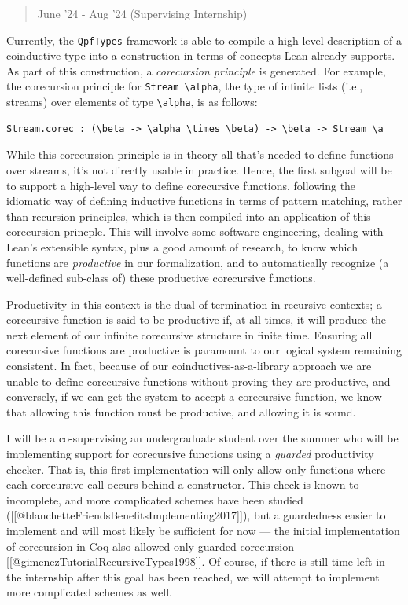 \documentclass[a4paper]{article}
\begin{document}
\begin{quote}
June '24 - Aug '24 (Supervising Internship)
\end{quote}

Currently, the \texttt{QpfTypes} framework is able to compile a
high-level description of a coinductive type into a construction in
terms of concepts Lean already supports. As part of this construction, a
\emph{corecursion principle} is generated. For example, the corecursion
principle for \texttt{Stream\ \textbackslash{}alpha}, the type of
infinite lists (i.e., streams) over elements of type
\texttt{\textbackslash{}alpha}, is as follows:

\begin{verbatim}
Stream.corec : (\beta -> \alpha \times \beta) -> \beta -> Stream \a
\end{verbatim}

While this corecursion principle is in theory all that's needed to
define functions over streams, it's not directly usable in practice.
Hence, the first subgoal will be to support a high-level way to define
corecursive functions, following the idiomatic way of defining inductive
functions in terms of pattern matching, rather than recursion
principles, which is then compiled into an application of this
corecursion princple. This will involve some software engineering,
dealing with Lean's extensible syntax, plus a good amount of research,
to know which functions are \emph{productive} in our formalization, and
to automatically recognize (a well-defined sub-class of) these
productive corecursive functions.

Productivity in this context is the dual of termination in recursive
contexts; a corecursive function is said to be productive if, at all
times, it will produce the next element of our infinite corecursive
structure in finite time. Ensuring all corecursive functions are
productive is paramount to our logical system remaining consistent. In
fact, because of our coinductives-as-a-library approach we are unable to
define corecursive functions without proving they are productive, and
conversely, if we can get the system to accept a corecursive function,
we know that allowing this function must be productive, and allowing it
is sound.

I will be a co-supervising an undergraduate student over the summer who
will be implementing support for corecursive functions using a
\emph{guarded} productivity checker. That is, this first implementation
will only allow only functions where each corecursive call occurs behind
a constructor. This check is known to incomplete, and more complicated
schemes have been studied
({[}{[}@blanchetteFriendsBenefitsImplementing2017{]}{]}), but a
guardedness easier to implement and will most likely be sufficient for
now --- the initial implementation of corecursion in Coq also allowed
only guarded corecursion {[}{[}@gimenezTutorialRecursiveTypes1998{]}{]}.
Of course, if there is still time left in the internship after this goal
has been reached, we will attempt to implement more complicated schemes
as well.
\end{document}
